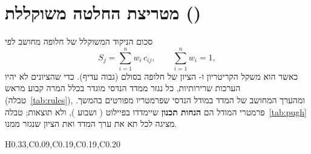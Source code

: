 \section{מטריצת החלטה משוקללת ()}\label{sec:pugh}
סכום הניקוד המשוקלל של חלופה  מחושב לפי
\begin{equation}
  S_j=\sum_{i=1}^{n} w_i\, c_{ij},\qquad \sum_{i=1}^{n} w_i = 1,
\end{equation}
כאשר  הוא משקל הקריטריון  ו- הציון של חלופה  בסולם  (גבוה עדיף). כדי שהציונים לא
יהיו הערכות שרירותיות, כל  נגזר ממדד הנדסי מוגדר בכלל המרה קבוע מראש (טבלה~\ref{tab:rules}), ומהערך המחושב של המדד
במודל הנדסי שפרמטריו מפורטים בהמשך. פרמטרי המודל הם \textbf{הנחות תכנון} שיימדדו בפיילוט ( ושבוע ), ולא
תוצאות; טבלה~\ref{tab:pugh} מציגה לכל תא את ערך המדד ואת הציון שנגזר ממנו.
\begin{table}[!htbp]
\centering
\caption{מטריצת החלטה משוקללת: ערך המדד ההנדסי \mth{\rightarrow} הציון ; סכום המשקלים }\label{tab:pugh}
\pughReset
\begin{pctable}{H{0.33},C{0.09},C{0.19},C{0.19},C{0.20}}
  \pughTotalsAbs
\end{pctable}
\pughCheck
\end{table}
